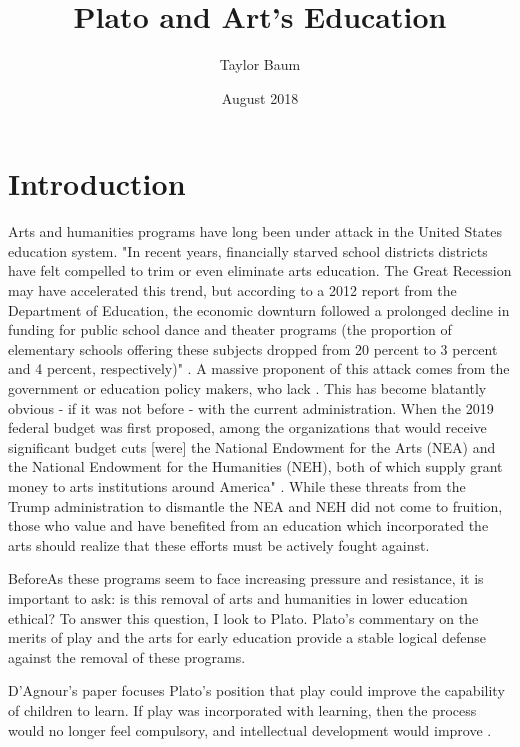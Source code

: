\documentclass[titlepage]{article}
\title{Plato and Art's Education}
\author{Taylor Baum}
\date{August 2018}
\begin{document}
\maketitle

\begin{abstract}
    
\end{abstract}

\section{Introduction}

Arts and humanities programs have long been under attack in the United States education system. "In recent years, financially starved school districts districts have felt compelled to trim or even eliminate arts education. The Great Recession may have accelerated this trend, but according to a 2012 report from the Department of Education, the economic downturn followed a prolonged decline in funding for public school dance and theater programs (the proportion of elementary schools offering these subjects dropped from 20 percent to 3 percent and 4 percent, respectively)" \cite{Mahnken2017}. A massive proponent of this attack comes from the government or education policy makers, who lack . This has become blatantly obvious - if it was not before - with the current administration. When the 2019 federal budget was first proposed, among the organizations that would receive significant budget cuts [were] the National Endowment for the Arts (NEA) and the National Endowment for the Humanities (NEH), both of which supply grant money to arts institutions around America" \cite{Greenberger2018}. While these threats from the Trump administration to dismantle the NEA and NEH did not come to fruition, those who value and have benefited from an education which incorporated the arts should realize that these efforts must be actively fought against.

BeforeAs these programs seem to face increasing pressure and resistance, it is important to ask: is this removal of arts and humanities in lower education ethical? To answer this question, I look to Plato. Plato's commentary on the merits of play and the arts for early education provide a stable logical defense against the removal of these programs.






D'Agnour's paper focuses Plato's position that play could improve the capability of children to learn. If play was incorporated with learning, then the process would no longer feel compulsory, and intellectual development would improve \cite{DAngour2013}.
\end{document}
